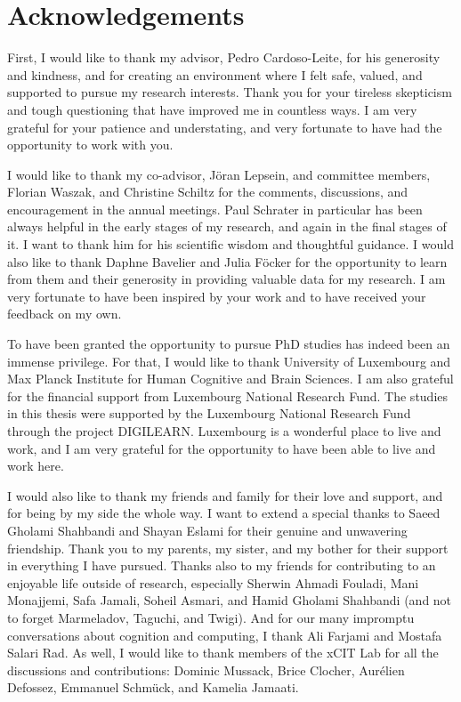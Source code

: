 \section*{Acknowledgements}

First, I would like to thank my advisor, Pedro Cardoso-Leite, for his generosity and kindness, and for creating an environment where I felt safe, valued, and supported to pursue my research interests. Thank you for your tireless skepticism and tough questioning that have improved me in countless ways. I am very grateful for your patience and understating, and very fortunate to have had the opportunity to work with you.

I would like to thank my co-advisor, Jöran Lepsein, and committee members, Florian Waszak, and Christine Schiltz for the comments, discussions, and encouragement in the annual meetings. Paul Schrater in particular has been always helpful in the early stages of my research, and again in the final stages of it. I want to thank him for his scientific wisdom and thoughtful guidance. I would also like to thank Daphne Bavelier and Julia Föcker for the opportunity to learn from them and their generosity in providing valuable data for my research. I am very fortunate to have been inspired by your work and to have received your feedback on my own.

To have been granted the opportunity to pursue PhD studies has indeed been an immense privilege. For that, I would like to thank University of Luxembourg and Max Planck Institute for Human Cognitive and Brain Sciences. I am also grateful for the financial support from Luxembourg National Research Fund. The studies in this thesis were supported by the Luxembourg National Research Fund through the project DIGILEARN. Luxembourg is a wonderful place to live and work, and I am very grateful for the opportunity to have been able to live and work here.

I would also like to thank my friends and family for their love and support, and for being by my side the whole way. I want to extend a special thanks to Saeed Gholami Shahbandi and Shayan Eslami for their genuine and unwavering friendship. Thank you to my parents, my sister, and my bother for their support in everything I have pursued. Thanks also to my friends for contributing to an enjoyable life outside of research, especially Sherwin Ahmadi Fouladi, Mani Monajjemi, Safa Jamali, Soheil Asmari, and Hamid Gholami Shahbandi (and not to forget Marmeladov, Taguchi, and Twigi). And for our many impromptu conversations about cognition and computing, I thank Ali Farjami and Mostafa Salari Rad. As well, I would like to thank members of the xCIT Lab for all the discussions and contributions: Dominic Mussack, Brice Clocher, Aurélien Defossez, Emmanuel Schmück, and Kamelia Jamaati.

